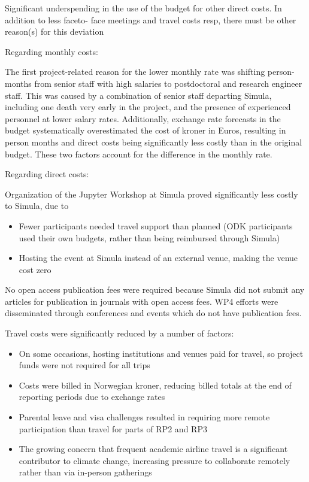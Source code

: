Significant underspending in the use of the budget for other direct costs. In addition to less faceto-
face meetings and travel costs resp, there must be other reason(s) for this deviation

Regarding monthly costs:

The first project-related reason for the lower monthly rate was shifting person-months from senior staff with high salaries
to postdoctoral and research engineer staff.
This was caused by a combination of senior staff departing Simula, including one death very early in the project,
and the presence of experienced personnel at lower salary rates.
Additionally, exchange rate forecasts in the budget systematically overestimated the cost of kroner in Euros,
resulting in person months and direct costs being significantly less costly than in the original budget.
These two factors account for the difference in the monthly rate.

Regarding direct costs:

Organization of the Jupyter Workshop at Simula proved significantly less costly to Simula, due to

\begin{itemize}
    \item Fewer participants needed travel support than planned (ODK participants used their own budgets, rather than being reimbursed through Simula)
    \item Hosting the event at Simula instead of an external venue, making the venue cost zero
\end{itemize}

No open access publication fees were required because Simula did not submit any articles for publication in journals with open access fees.
WP4 efforts were disseminated through conferences and events which do not have publication fees.

Travel costs were significantly reduced by a number of factors:

\begin{itemize}
  \item On some occasions, hosting institutions and venues paid for travel, so project funds were not required for all trips
  \item Costs were billed in Norwegian kroner, reducing billed totals at the end of reporting periods due to exchange rates
  \item Parental leave and visa challenges resulted in requiring more remote participation
    than travel for parts of RP2 and RP3
  \item The growing concern that frequent academic airline travel is a significant contributor to climate change,
    increasing pressure to collaborate remotely rather than via in-person gatherings
\end{itemize}

